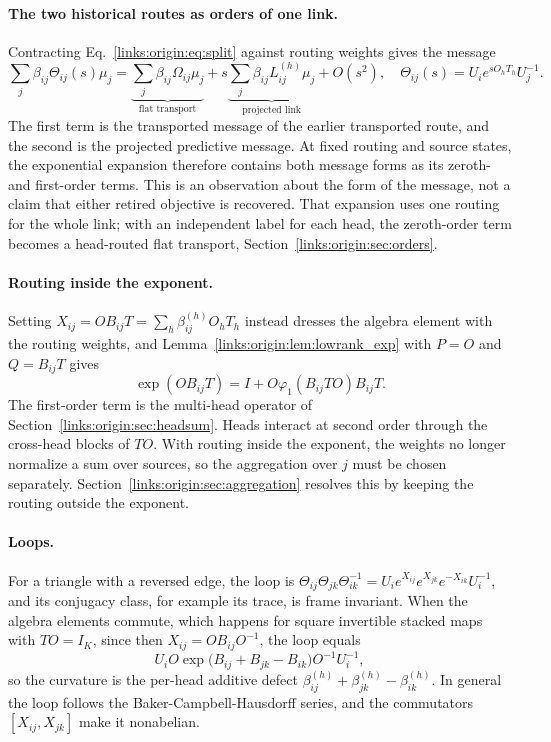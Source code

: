\documentclass[11pt]{article}
\theoremstyle{definition}
\theoremstyle{remark}
\begin{document}
\paragraph{The two historical routes as orders of one link.}
Contracting Eq.~\eqref{links:origin:eq:split} against routing weights gives the message
\begin{equation}
\sum_j\beta_{ij}\Theta_{ij}(s)\mu_j
=\underbrace{\sum_j\beta_{ij}\Omega_{ij}\mu_j}_{\text{flat transport}}
+s\underbrace{\sum_j\beta_{ij}L_{ij}^{(h)}\mu_j}_{\text{projected link}}+O(s^2),
\quad \Theta_{ij}(s)=U_i e^{sO_hT_h}U_j^{-1}.
\label{links:origin:eq:two_routes}
\end{equation}
The first term is the transported message of the earlier transported route, and the second is the projected predictive message. At fixed routing and source states, the exponential expansion therefore contains both message forms as its zeroth- and first-order terms. This is an observation about the form of the message, not a claim that either retired objective is recovered. That expansion uses one routing for the whole link; with an independent label for each head, the zeroth-order term becomes a head-routed flat transport, Section~\ref{links:origin:sec:orders}.

\paragraph{Routing inside the exponent.}
Setting $X_{ij}=OB_{ij}T=\sum_h\beta_{ij}^{(h)}O_hT_h$ instead dresses the algebra element with the routing weights, and Lemma~\ref{links:origin:lem:lowrank_exp} with $P=O$ and $Q=B_{ij}T$ gives
\begin{equation}
\exp(OB_{ij}T)=I+O\varphi_1(B_{ij}TO)B_{ij}T.
\label{links:origin:eq:exp_routed}
\end{equation}
The first-order term is the multi-head operator of Section~\ref{links:origin:sec:headsum}. Heads interact at second order through the cross-head blocks of $TO$. With routing inside the exponent, the weights no longer normalize a sum over sources, so the aggregation over $j$ must be chosen separately. Section~\ref{links:origin:sec:aggregation} resolves this by keeping the routing outside the exponent.

\paragraph{Loops.}
For a triangle with a reversed edge, the loop is $\Theta_{ij}\Theta_{jk}\Theta_{ik}^{-1}=U_ie^{X_{ij}}e^{X_{jk}}e^{-X_{ik}}U_i^{-1}$, and its conjugacy class, for example its trace, is frame invariant. When the algebra elements commute, which happens for square invertible stacked maps with $TO=I_K$, since then $X_{ij}=OB_{ij}O^{-1}$, the loop equals
\begin{equation}
U_iO\exp\big(B_{ij}+B_{jk}-B_{ik}\big)O^{-1}U_i^{-1},
\label{links:origin:eq:exp_loop}
\end{equation}
so the curvature is the per-head additive defect $\beta_{ij}^{(h)}+\beta_{jk}^{(h)}-\beta_{ik}^{(h)}$. In general the loop follows the Baker-Campbell-Hausdorff series, and the commutators $[X_{ij},X_{jk}]$ make it nonabelian.
\end{document}

